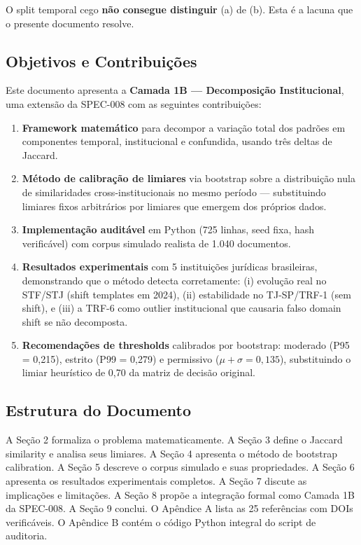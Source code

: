 \documentclass[12pt,a4paper]{article}
\theoremstyle{remark}
\begin{document}
O split temporal cego \textbf{não consegue distinguir} (a) de (b). Esta é a lacuna que o presente documento resolve.

\subsection{Objetivos e Contribuições}

Este documento apresenta a \textbf{Camada 1B — Decomposição Institucional}, uma extensão da SPEC-008 com as seguintes contribuições:

\begin{enumerate}[label=CO\arabic*:, nosep]
  \item \textbf{Framework matemático} para decompor a variação total dos padrões em componentes temporal, institucional e confundida, usando três deltas de Jaccard.
  \item \textbf{Método de calibração de limiares} via bootstrap sobre a distribuição nula de similaridades cross-institucionais no mesmo período — substituindo limiares fixos arbitrários por limiares que emergem dos próprios dados.
  \item \textbf{Implementação auditável} em Python (725 linhas, seed fixa, hash verificável) com corpus simulado realista de 1.040 documentos.
  \item \textbf{Resultados experimentais} com 5 instituições jurídicas brasileiras, demonstrando que o método detecta corretamente: (i) evolução real no STF/STJ (shift templates em 2024), (ii) estabilidade no TJ-SP/TRF-1 (sem shift), e (iii) a TRF-6 como outlier institucional que causaria falso domain shift se não decomposta.
  \item \textbf{Recomendações de thresholds} calibrados por bootstrap: moderado (P95 = 0,215), estrito (P99 = 0,279) e permissivo ($\mu + \sigma = 0,135$), substituindo o limiar heurístico de 0,70 da matriz de decisão original.
\end{enumerate}

\subsection{Estrutura do Documento}

A Seção 2 formaliza o problema matematicamente. A Seção 3 define o Jaccard similarity e analisa seus limiares. A Seção 4 apresenta o método de bootstrap calibration. A Seção 5 descreve o corpus simulado e suas propriedades. A Seção 6 apresenta os resultados experimentais completos. A Seção 7 discute as implicações e limitações. A Seção 8 propõe a integração formal como Camada 1B da SPEC-008. A Seção 9 conclui. O Apêndice A lista as 25 referências com DOIs verificáveis. O Apêndice B contém o código Python integral do script de auditoria.
\end{document}

